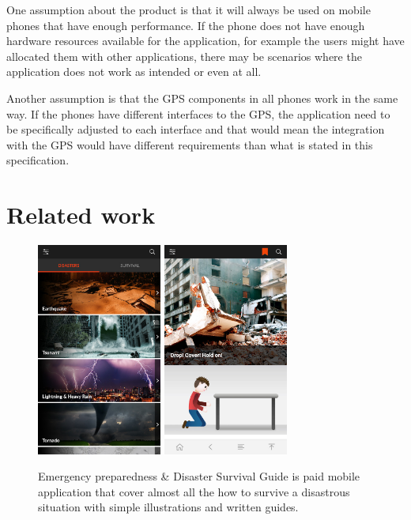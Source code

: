 \documentclass{scrreprt}
\begin{document}
One assumption about the product is that it will always be used on mobile phones that have enough performance. If the phone does not have enough hardware resources available for the application, for
example the users might have allocated them with other applications, there may be scenarios where the application does not work as intended or even at all.

Another assumption is that the GPS components in all phones work in the same way. If the phones have different interfaces to the GPS, the application need to be specifically adjusted to each interface and that would mean the integration with the GPS would have different requirements than what is stated in this specification.

\newpage
\section{Related work}
\begin{figure}[ht!]
    \centering
    \includegraphics[height=7cm]{appImages/EPD1.jpg}
    \qquad
    \includegraphics[height=7cm]{appImages/EPD2.jpg}
    \caption[Emergency preparedness \& Disaster Survival Guide]{Emergency preparedness \& Disaster Survival Guide is paid mobile application that cover almost all the how to survive a disastrous situation with simple  illustrations and written guides.}%
    \label{fig:app1}%
\end{figure}
\end{document}
